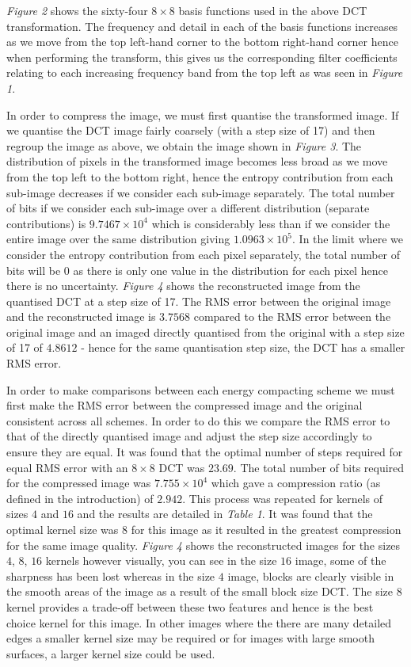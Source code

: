 \documentclass{article}					%
\begin{document}
\textit{Figure 2} shows the sixty-four $8\times 8$ basis functions used in the above DCT transformation. The frequency and detail in each of the basis functions increases as we move from the top left-hand corner to the bottom right-hand corner hence when performing the transform, this gives us the corresponding filter coefficients relating to each increasing frequency band from the top left as was seen in \textit{Figure 1}.

In order to compress the image, we must first quantise the transformed image. If we quantise the DCT image fairly coarsely (with a step size of 17) and then regroup the image as above, we obtain the image shown in \textit{Figure 3}. The distribution of pixels in the transformed image becomes less broad as we move from the top left to the bottom right, hence the entropy contribution from each sub-image decreases if we consider each sub-image separately. The total number of bits if we consider each sub-image over a different distribution (separate contributions) is $9.7467\times 10^4$ which is considerably less than if we consider the entire image over the same distribution giving $1.0963\times 10^5$. In the limit where we consider the entropy contribution from each pixel separately, the total number of bits will be 0 as there is only one value in the distribution for each pixel hence there is no uncertainty. \textit{Figure 4} shows the reconstructed image from the quantised DCT at a step size of 17. The RMS error between the original image and the reconstructed image is $3.7568$ compared to the RMS error between the original image and an imaged directly quantised from the original with a step size of 17 of $4.8612$ - hence for the same quantisation step size, the DCT has a smaller RMS error.

In order to make comparisons between each energy compacting scheme we must first make the RMS error between the compressed image and the original consistent across all schemes. In order to do this we compare the RMS error to that of the directly quantised image and adjust the step size accordingly to ensure they are equal. It was found that the optimal number of steps required for equal RMS error with an $8 \times 8$ DCT was $23.69$. The total number of bits required for the compressed image was $7.755\times 10^4$ which gave a compression ratio (as defined in the introduction) of $2.942$. This process was repeated for kernels of sizes $4$ and $16$ and the results are detailed in \textit{Table 1}. It was found that the optimal kernel size was $8$ for this image as it resulted in the greatest compression for the same image quality. \textit{Figure 4} shows the reconstructed images for the sizes $4$, $8$, $16$ kernels however visually, you can see in the size $16$ image, some of the sharpness has been lost whereas in the size $4$ image, blocks are clearly visible in the smooth areas of the image as a result of the small block size DCT. The size $8$ kernel provides a trade-off between these two features and hence is the best choice kernel for this image. In other images where the there are many detailed edges a smaller kernel size may be required or for images with large smooth surfaces, a larger kernel size could be used.
\end{document}
